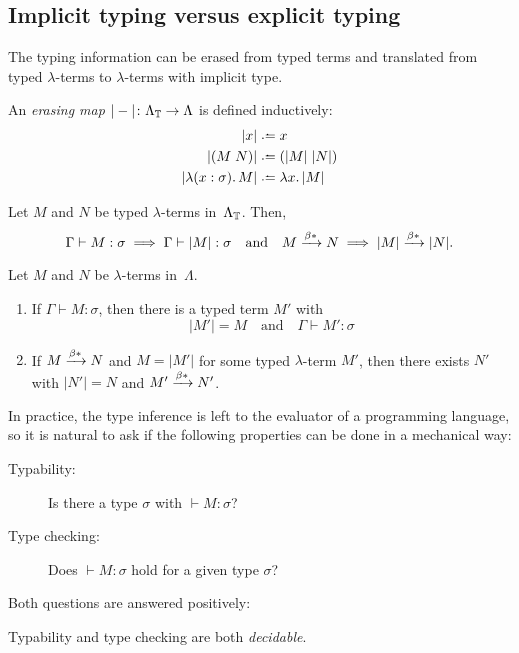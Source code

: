 \subsection{Implicit typing versus explicit typing}
The typing information can be erased from typed terms and translated
from typed $\lambda$-terms to $\lambda$-terms with implicit type.
\begin{definition}
  An \emph{erasing map} $|-|\colon \Lambda_{\mathbb{T}} \to \Lambda$ is defined
  inductively:
  \begin{align*}
    |x| & \defeq x \\
    |(M\; N)| & \defeq (|M|\;|N|) \\
    |\lambda (x:\sigma).\, M| & \defeq \lambda x.\, |M|
  \end{align*}
\end{definition}
\begin{proposition}
  Let $M$ and $N$ be typed $\lambda$-terms in~$\Lambda_{\mathbb{T}}$. Then, 
  \[
    \Gamma \vdash M : \sigma \implies \Gamma \vdash |M| : \sigma
    \quad\text{and}\quad M \xrightarrow{\beta*} N \implies |M| \xrightarrow{\beta*} |N|.
  \]
\end{proposition}
\begin{proposition}
  Let $M$ and $N$ be $\lambda$-terms in~$\Lambda$. 
  \begin{enumerate}
    \item If $\Gamma \vdash M : \sigma$, then there is a typed term $M'$ with 
      \[
        |M'| = M
        \quad\text{and}\quad
        \Gamma \vdash M' : \sigma
      \]
    \item If $M \xrightarrow{\beta*} N$ and $M = |M'|$ for some typed $\lambda$-term $M'$,
      then there exists $N'$ with $|N'| = N$ and $M' \xrightarrow{\beta*} N'$.
    \end{enumerate}
\end{proposition}

In practice, the type inference is left to the evaluator of a programming
language, so it is natural to ask if the following properties can be done
in a mechanical way:
\begin{description}
  \item[Typability:] Is there a type $\sigma$ with $\vdash M : \sigma$? 
  \item[Type checking:] Does $\vdash M : \sigma$ hold for a given type $\sigma$?
  \end{description}
Both questions are answered positively:

\begin{theorem}
  Typability and type checking are both \emph{decidable}.
\end{theorem}

